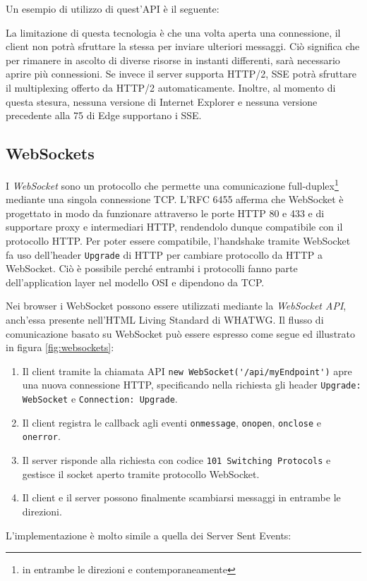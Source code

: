 \documentclass[12pt,a4paper,openright,twoside]{report}
\begin{document}
Un esempio di utilizzo di quest'API è il seguente:


La limitazione di questa tecnologia è che una volta aperta una connessione, il client non potrà sfruttare la stessa per inviare ulteriori messaggi. Ciò significa che per rimanere in ascolto di diverse risorse in instanti differenti, sarà necessario aprire più connessioni. Se invece il server supporta HTTP/2, SSE potrà sfruttare il multiplexing offerto da HTTP/2 automaticamente.
Inoltre, al momento di questa stesura, nessuna versione di Internet Explorer e nessuna versione precedente alla 75 di Edge supportano i SSE\cite{sse_support_caniuse}.

\subsection{WebSockets}
I \textit{WebSocket} sono un protocollo che permette una comunicazione full-duplex\footnote{in entrambe le direzioni e contemporaneamente} mediante una singola connessione TCP.
L'RFC 6455 afferma che WebSocket è progettato in modo da funzionare attraverso le porte HTTP 80 e 433 e di supportare proxy e intermediari HTTP, rendendolo dunque compatibile con il protocollo HTTP\cite{websockets_rfc}. Per poter essere compatibile, l'handshake tramite WebSocket fa uso dell'header \lstinline{Upgrade} di HTTP per cambiare protocollo da HTTP a WebSocket. Ciò è possibile perché entrambi i protocolli fanno parte dell'application layer nel modello OSI e dipendono da TCP.

\bigskip

Nei browser i WebSocket possono essere utilizzati mediante la \textit{WebSocket API}, anch'essa presente nell'HTML Living Standard di WHATWG.
Il flusso di comunicazione basato su WebSocket può essere espresso come segue\cite{websockets} ed illustrato in figura \ref{fig:websockets}:
\begin{enumerate}
  \item Il client tramite la chiamata API \lstinline{new WebSocket('/api/myEndpoint')} apre una nuova connessione HTTP, specificando nella richiesta gli header \lstinline{Upgrade: WebSocket} e \lstinline{Connection: Upgrade}.
  \item Il client registra le callback agli eventi \lstinline{onmessage}, \lstinline{onopen}, \lstinline{onclose} e \lstinline{onerror}.
  \item Il server risponde alla richiesta con codice \lstinline{101 Switching Protocols} e gestisce il socket aperto tramite protocollo WebSocket.
  \item Il client e il server possono finalmente scambiarsi messaggi in entrambe le direzioni.
\end{enumerate}
L'implementazione è molto simile a quella dei Server Sent Events:

\end{document}
